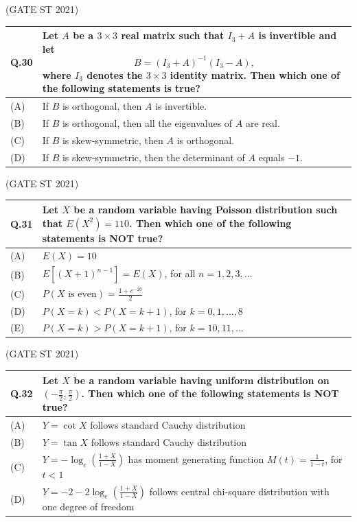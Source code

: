 \documentclass[journal,12pt,onecolumn]{IEEEtran}
\theoremstyle{remark}
\begin{document}
\bigskip
\hfill (GATE ST 2021)
\\
\begin{tabular}{|p{1cm}|p{14cm}|}
\hline
\textbf{Q.30} &
Let $A$ be a $3 \times 3$ real matrix such that $I_3 + A$ is invertible and let
$$
B = (I_3 + A)^{-1} (I_3 - A),
$$
where $I_3$ denotes the $3 \times 3$ identity matrix. Then which one of the following statements is true?\\
\hline

(A) & If $B$ is orthogonal, then $A$ is invertible.\\
\hline
(B) & If $B$ is orthogonal, then all the eigenvalues of $A$ are real.\\
\hline
(C) & If $B$ is skew-symmetric, then $A$ is orthogonal.\\
\hline
(D) & If $B$ is skew-symmetric, then the determinant of $A$ equals $-1$.\\
\hline
\end{tabular}

\bigskip
\hfill (GATE ST 2021)
\\
\begin{tabular}{|p{1cm}|p{14cm}|}
\hline
\textbf{Q.31} &
Let $X$ be a random variable having Poisson distribution such that $E(X^2) = 110$. Then which one of the following statements is NOT true?\\
\hline

(A) & $E(X) = 10$\\
\hline
(B) & $E[(X+1)^{n-1}] = E(X)$, for all $n = 1, 2, 3, \dots$\\
\hline
(C) & $P(X \text{ is even}) = \frac{1 + e^{-20}}{2}$\\
\hline
(D) & $P(X = k) < P(X = k+1)$, for $k = 0,1,\dots, 8$\\
\hline
(E) & $P(X = k) > P(X = k+1)$, for $k = 10, 11, \dots$\\
\hline
\end{tabular}

\bigskip
\hfill (GATE ST 2021)
\\
\begin{tabular}{|p{1cm}|p{14cm}|}
\hline
\textbf{Q.32} &
Let $X$ be a random variable having uniform distribution on $\left(-\frac{\pi}{2}, \frac{\pi}{2}\right)$. Then which one of the following statements is NOT true?\\
\hline

(A) & $Y = \cot X$ follows standard Cauchy distribution\\
\hline
(B) & $Y = \tan X$ follows standard Cauchy distribution\\
\hline
(C) & $Y = -\log_e\left( \frac{1+X}{1 - X} \right)$ has moment generating function $M(t) = \frac{1}{1 - t}$, for $t < 1$\\
\hline
(D) & $Y = -2 - 2 \log_e \left( \frac{1+X}{1-X}\right)$ follows central chi-square distribution with one degree of freedom\\
\hline
\end{tabular}
\end{document}
